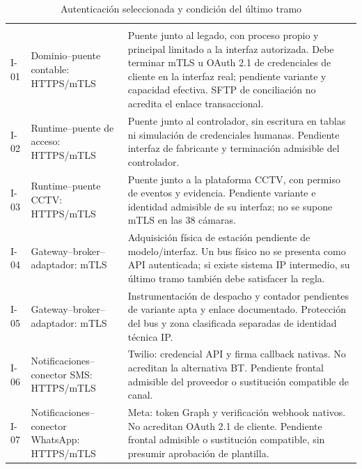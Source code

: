 \begin{longtable}{@{}L{.12\linewidth}L{.32\linewidth}L{\dimexpr.56\tabcolsep\relax}@{}}
\caption{Autenticación seleccionada y condición del último tramo}\label{tab:a42-identidad}\\
\hline
{} &  & \\ \hline
\endfirsthead
\hline
{} &  & \\ \hline
\endhead
I-01 & Dominio--puente contable: HTTPS/mTLS & Puente junto al legado, con proceso propio y principal limitado a la interfaz autorizada. Debe terminar mTLS u OAuth 2.1 de credenciales de cliente en la interfaz real; pendiente variante y capacidad efectiva. SFTP de conciliación no acredita el enlace transaccional.\\ \hline
I-02 & Runtime--puente de acceso: HTTPS/mTLS & Puente junto al controlador, sin escritura en tablas ni simulación de credenciales humanas. Pendiente interfaz de fabricante y terminación admisible del controlador.\\ \hline
I-03 & Runtime--puente CCTV: HTTPS/mTLS & Puente junto a la plataforma CCTV, con permiso de eventos y evidencia. Pendiente variante e identidad admisible de su interfaz; no se supone mTLS en las 38 cámaras.\\ \hline
I-04 & Gateway--broker--adaptador: mTLS & Adquisición física de estación pendiente de modelo/interfaz. Un bus físico no se presenta como API autenticada; si existe sistema IP intermedio, su último tramo también debe satisfacer la regla.\\ \hline
I-05 & Gateway--broker--adaptador: mTLS & Instrumentación de despacho y contador pendientes de variante apta y enlace documentado. Protección del bus y zona clasificada separadas de identidad técnica IP.\\ \hline
I-06 & Notificaciones--conector SMS: HTTPS/mTLS & Twilio: credencial API y firma callback nativas. No acreditan la alternativa BT. Pendiente frontal admisible del proveedor o sustitución compatible de canal.\\ \hline
I-07 & Notificaciones--conector WhatsApp: HTTPS/mTLS & Meta: token Graph y verificación webhook nativos. No acreditan OAuth 2.1 de cliente. Pendiente frontal admisible o sustitución compatible, sin presumir aprobación de plantilla.\\ \hline

\end{longtable}
